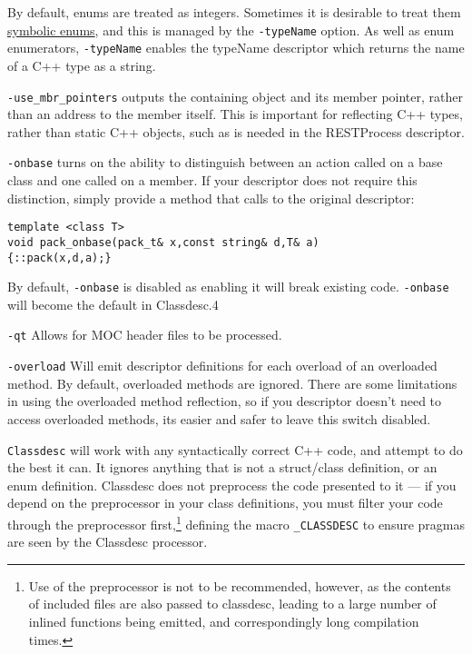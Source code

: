 By default, enums are treated as integers. Sometimes it is desirable
to treat them \hyperref{symbolically}{ (see \S}{)}{symbolic enums}, and
this is managed by the \verb+-typeName+ option. As
well as enum enumerators,  \verb+-typeName+ enables the typeName
descriptor which returns the name of a C++ type as a string.

\verb+-use_mbr_pointers+ outputs the containing object and its member
pointer, rather than an address to the member itself. This is
important for reflecting C++ types, rather than static C++ objects,
such as is needed in the RESTProcess descriptor.

\verb+-onbase+ turns on the ability to distinguish between an action
called on a base class and one called on a member. If your descriptor
does not require this distinction, simply provide a method that calls
to the original descriptor:
\begin{verbatim}
template <class T>
void pack_onbase(pack_t& x,const string& d,T& a)
{::pack(x,d,a);}
\end{verbatim} 
By default, \verb+-onbase+ is disabled as enabling it will break existing
code. \verb+-onbase+ will become the default in Classdesc.4

\verb+-qt+ Allows for MOC header files to be processed.

\verb+-overload+ Will emit descriptor definitions for each overload of
an overloaded method. By default, overloaded methods are ignored.
There are some limitations in using the overloaded method reflection,
so if you descriptor doesn't need to access overloaded methods, its
easier and safer to leave this switch disabled.


{\tt Classdesc} will work with any syntactically correct C++ code, and
attempt to do the best it can. It ignores anything that is not a
struct/class definition, or an enum definition. Classdesc
does not preprocess the code presented to it --- if you depend on the
preprocessor in your class definitions, you must filter your code
through the preprocessor first,\footnote{Use of
the preprocessor is not to be recommended, however, as the contents of
included files are also passed to classdesc, leading to a large number
of inlined functions being emitted, and correspondingly long
compilation times.} defining the macro
\verb+_CLASSDESC+ to ensure pragmas are seen by the
Classdesc processor.

